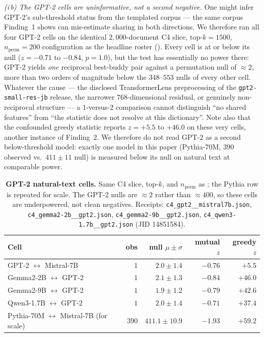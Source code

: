\emph{(i\,b) The GPT-2 cells are uninformative, not a second negative.} One might infer
GPT-2's sub-threshold status from the templated corpus --- the same corpus
Finding~1 shows can mis-estimate sharing in both directions. We therefore ran
all four GPT-2 cells on the identical $2{,}000$-document C4 slice, $\text{top-}k{=}1500$,
$n_{\text{perm}}{=}200$ configuration as the headline roster (). Every
cell is at or below its null ($z=-0.71$ to $-0.84$, $p=1.0$), but the test has essentially
no power there: GPT-2 yields \emph{one} reciprocal best-buddy pair against a permutation
null of ${\approx}2$, more than two orders of magnitude below the $348$--$553$ nulls of every other
cell. Whatever the cause --- the disclosed TransformerLens preprocessing of the
\texttt{gpt2-small-res-jb} release, the narrower $768$-dimensional residual, or genuinely
non-reciprocal structure --- a $1$-versus-$2$ comparison cannot distinguish ``no shared
features'' from ``the statistic does not resolve at this dictionary''. Note also that the
confounded greedy statistic reports $z=+5.5$ to $+46.0$ on these very cells, another
instance of Finding~2. We therefore do not read GPT-2 as a second below-threshold model:
exactly one model in this paper (Pythia-70M, $390$ observed vs.\ $411{\pm}11$ null) is
measured below its null on natural text at comparable power.

\begin{table}[h]
\centering
\caption{\textbf{GPT-2 natural-text cells.} Same C4 slice, top-$k$, and
$n_{\text{perm}}$ as ; the Pythia row is repeated for scale. The GPT-2
nulls are ${\approx}2$ rather than ${\approx}400$, so these cells are underpowered, not
clean negatives. Receipts: \texttt{c4\_gpt2\_\_mistral7b.json},
\texttt{c4\_gemma2-2b\_\_gpt2.json}, \texttt{c4\_gemma2-9b\_\_gpt2.json},
\texttt{c4\_qwen3-1.7b\_\_gpt2.json} (JID 14851584).}
\label{tab:gpt2_c4}
\footnotesize
\setlength{\tabcolsep}{4pt}
\begin{tabular}{lrrrr}
\toprule
Cell & obs & null $\mu{\pm}\sigma$ & mutual $z$ & greedy $z$ \\
\midrule
GPT-2 $\leftrightarrow$ Mistral-7B     & $1$ & $2.0{\pm}1.4$ & $-0.76$ & $+5.5$ \\
Gemma2-2B $\leftrightarrow$ GPT-2      & $1$ & $2.1{\pm}1.3$ & $-0.84$ & $+46.0$ \\
Gemma2-9B $\leftrightarrow$ GPT-2      & $1$ & $1.9{\pm}1.2$ & $-0.79$ & $+42.6$ \\
Qwen3-1.7B $\leftrightarrow$ GPT-2     & $1$ & $2.0{\pm}1.4$ & $-0.71$ & $+37.4$ \\
\midrule
Pythia-70M $\leftrightarrow$ Mistral-7B (for scale) & $390$ & $411.1{\pm}10.9$ & $-1.93$ & $+59.2$ \\
\bottomrule
\end{tabular}
\end{table}

